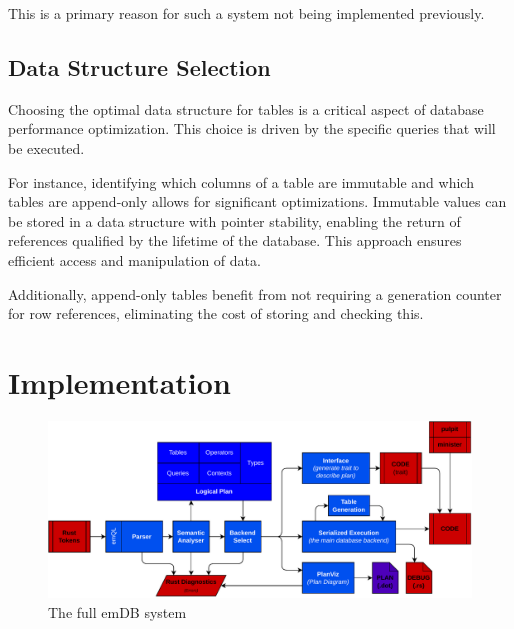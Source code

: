 \documentclass[conference]{IEEEtran}
\begin{document}
This is a primary reason for such a system not being implemented previously.

\subsection{Data Structure Selection}
% 

Choosing the optimal data structure for tables is a critical aspect of database performance optimization.
This choice is driven by the specific queries that will be executed.

For instance, identifying which columns of a table are immutable and which tables are append-only
allows for significant optimizations. Immutable values can be stored in a data structure with pointer
stability, enabling the return of references qualified by the lifetime of the database. This approach
ensures efficient access and manipulation of data.

Additionally, append-only tables benefit from not requiring a generation counter for row references,
eliminating the cost of storing and checking this.

\section{Implementation}

\begin{figure}[b]
    \centering
    \includegraphics[width=\textwidth]{_diagrams/system.pdf}
    \caption{The full emDB system}
    \label{fig:emdb-system}
\end{figure}
\end{document}
